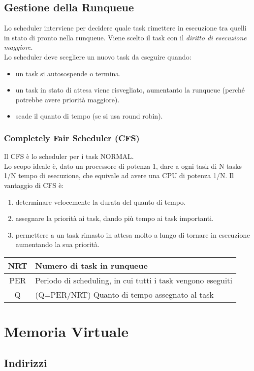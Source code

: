 \documentclass[10pt,a4paper]{article}
\begin{document}
\subsection{Gestione della Runqueue}
Lo scheduler interviene per decidere quale task rimettere in esecuzione tra quelli in stato di pronto nella runqueue. Viene scelto il task con il \emph{diritto di esecuzione maggiore}.\\
Lo scheduler deve scegliere un nuovo task da eseguire quando:
\begin{itemize}
    \item un task si autosospende o termina.
    \item un task in stato di attesa viene risvegliato, aumentanto la runqueue (perché potrebbe avere priorità maggiore).
    \item scade il quanto di tempo (se si usa round robin).
\end{itemize}

\subsubsection{Completely Fair Scheduler (CFS)}
Il CFS è lo scheduler per i task NORMAL.\\
Lo scopo ideale è, dato un processore di potenza 1, dare a ogni task di N tasks 1/N tempo di esecuzione, che equivale ad avere una CPU di potenza 1/N.
Il vantaggio di CFS è:
\begin{enumerate}
    \item determinare velocemente la durata del quanto di tempo.
    \item assegnare la priorità ai task, dando più tempo ai task importanti.
    \item permettere a un task rimasto in attesa molto a lungo di tornare in esecuzione aumentando la sua priorità.
\end{enumerate}
\begin{tabular}{|c|l|}
    \hline
    NRT &Numero di task in runqueue\\
    \hline
    PER &Periodo di scheduling, in cui tutti i task vengono eseguiti\\
    \hline
    Q & (Q=PER/NRT) \qquad Quanto di tempo assegnato al task\\
    \hline
\end{tabular}

\section{Memoria Virtuale}

\subsection{Indirizzi}
\end{document}
